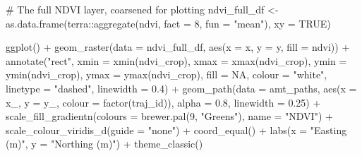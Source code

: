 \documentclass[
  letterpaper,
  DIV=11,
  numbers=noendperiod]{scrartcl}
\newenvironment{Shaded}{\begin{snugshade}}{\end{snugshade}}
\newcommand{\AttributeTok}[1]{\textcolor[rgb]{0.40,0.45,0.13}{#1}}
\newcommand{\CommentTok}[1]{\textcolor[rgb]{0.37,0.37,0.37}{#1}}
\newcommand{\ConstantTok}[1]{\textcolor[rgb]{0.56,0.35,0.01}{#1}}
\newcommand{\DecValTok}[1]{\textcolor[rgb]{0.68,0.00,0.00}{#1}}
\newcommand{\FloatTok}[1]{\textcolor[rgb]{0.68,0.00,0.00}{#1}}
\newcommand{\FunctionTok}[1]{\textcolor[rgb]{0.28,0.35,0.67}{#1}}
\newcommand{\NormalTok}[1]{\textcolor[rgb]{0.00,0.23,0.31}{#1}}
\newcommand{\OtherTok}[1]{\textcolor[rgb]{0.00,0.23,0.31}{#1}}
\newcommand{\SpecialCharTok}[1]{\textcolor[rgb]{0.37,0.37,0.37}{#1}}
\newcommand{\StringTok}[1]{\textcolor[rgb]{0.13,0.47,0.30}{#1}}
\newcounter{none} %
\begin{document}
\begin{Shaded}
\begin{Highlighting}[]
\CommentTok{\# The full NDVI layer, coarsened for plotting}
\NormalTok{ndvi\_full\_df }\OtherTok{\textless{}{-}} \FunctionTok{as.data.frame}\NormalTok{(terra}\SpecialCharTok{::}\FunctionTok{aggregate}\NormalTok{(ndvi, }\AttributeTok{fact =} \DecValTok{8}\NormalTok{, }\AttributeTok{fun =} \StringTok{"mean"}\NormalTok{), }\AttributeTok{xy =} \ConstantTok{TRUE}\NormalTok{)}

\FunctionTok{ggplot}\NormalTok{() }\SpecialCharTok{+}
  \FunctionTok{geom\_raster}\NormalTok{(}\AttributeTok{data =}\NormalTok{ ndvi\_full\_df, }\FunctionTok{aes}\NormalTok{(}\AttributeTok{x =}\NormalTok{ x, }\AttributeTok{y =}\NormalTok{ y, }\AttributeTok{fill =}\NormalTok{ ndvi)) }\SpecialCharTok{+}
  \FunctionTok{annotate}\NormalTok{(}\StringTok{"rect"}\NormalTok{,}
           \AttributeTok{xmin =} \FunctionTok{xmin}\NormalTok{(ndvi\_crop), }\AttributeTok{xmax =} \FunctionTok{xmax}\NormalTok{(ndvi\_crop),}
           \AttributeTok{ymin =} \FunctionTok{ymin}\NormalTok{(ndvi\_crop), }\AttributeTok{ymax =} \FunctionTok{ymax}\NormalTok{(ndvi\_crop),}
           \AttributeTok{fill =} \ConstantTok{NA}\NormalTok{, }\AttributeTok{colour =} \StringTok{"white"}\NormalTok{, }\AttributeTok{linetype =} \StringTok{"dashed"}\NormalTok{, }\AttributeTok{linewidth =} \FloatTok{0.4}\NormalTok{) }\SpecialCharTok{+}
  \FunctionTok{geom\_path}\NormalTok{(}\AttributeTok{data =}\NormalTok{ amt\_paths,}
            \FunctionTok{aes}\NormalTok{(}\AttributeTok{x =}\NormalTok{ x\_, }\AttributeTok{y =}\NormalTok{ y\_, }\AttributeTok{colour =} \FunctionTok{factor}\NormalTok{(traj\_id)),}
            \AttributeTok{alpha =} \FloatTok{0.8}\NormalTok{, }\AttributeTok{linewidth =} \FloatTok{0.25}\NormalTok{) }\SpecialCharTok{+}
  \FunctionTok{scale\_fill\_gradientn}\NormalTok{(}\AttributeTok{colours =} \FunctionTok{brewer.pal}\NormalTok{(}\DecValTok{9}\NormalTok{, }\StringTok{"Greens"}\NormalTok{), }\AttributeTok{name =} \StringTok{"NDVI"}\NormalTok{) }\SpecialCharTok{+}
  \FunctionTok{scale\_colour\_viridis\_d}\NormalTok{(}\AttributeTok{guide =} \StringTok{"none"}\NormalTok{) }\SpecialCharTok{+}
  \FunctionTok{coord\_equal}\NormalTok{() }\SpecialCharTok{+}
  \FunctionTok{labs}\NormalTok{(}\AttributeTok{x =} \StringTok{"Easting (m)"}\NormalTok{, }\AttributeTok{y =} \StringTok{"Northing (m)"}\NormalTok{) }\SpecialCharTok{+}
  \FunctionTok{theme\_classic}\NormalTok{()}
\end{Highlighting}
\end{Shaded}
\end{document}
